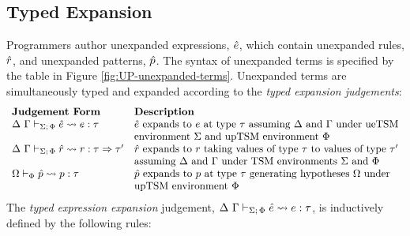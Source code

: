 {{{{\subsection{Typed Expansion}
Programmers author unexpanded expressions, $\hat{e}$, which contain unexpanded rules, $\hat{r}$, and unexpanded patterns, $\hat{p}$. The syntax of unexpanded terms is specified by the table in Figure \ref{fig:UP-unexpanded-terms}. Unexpanded terms are simultaneously typed and expanded according to the \emph{typed expansion judgements}:
\[\begin{array}{ll}
\textbf{Judgement Form} & \textbf{Description}\\
\Delta~\Gamma \vdash_{\Sigma;\,\Phi} \hat{e} \leadsto e : \tau & \text{$\hat{e}$ expands to $e$ at type $\tau$ assuming $\Delta$ and $\Gamma$ under ueTSM}\\
& \text{environment $\Sigma$ and upTSM environment $\Phi$}\\
\Delta~\Gamma \vdash_{\Sigma;\,\Phi} \hat{r} \leadsto r : \tau \Rightarrow \tau' & \text{$\hat{r}$ expands to $r$ taking values of type $\tau$ to values of type $\tau'$}\\
& \text{assuming $\Delta$ and $\Gamma$ under TSM environments $\Sigma$ and $\Phi$}\\
\Omega \vdash_{\Phi} \hat{p} \leadsto p : \tau & \text{$\hat{p}$ expands to $p$ at type $\tau$ generating hypotheses $\Omega$ under}\\
& \text{upTSM environment $\Phi$}
\end{array}\]
The \emph{typed expression expansion} judgement, $\Delta~\Gamma \vdash_{\Sigma;\,\Phi} \hat{e} \leadsto e : \tau$, is inductively defined by the following rules:
}}}}
